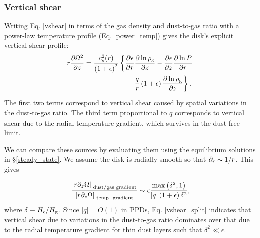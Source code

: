 \subsubsection{Vertical shear}\label{vertshear}
Writing Eq. \ref{vshear} in terms of the gas density and dust-to-gas
ratio with a power-law temperature profile (Eq. \ref{power_temp})
gives the disk's explicit vertical shear profile:
\begin{align}\label{vshear2}
  &r\frac{\p \Omega^2}{\p z}  =
  \frac{c_s^2(r)}{\left(1+\epsilon\right)^2}\left\{
  \frac{\p\epsilon}{\p r}\frac{\p\ln{\rhog}}{\p z}
 -\frac{\p\epsilon}{\p z}\frac{\p\ln{P}}{\p r}\right.\notag\\
  &\phantom{ r\frac{\p \Omega^2}{\p z}  =
    \frac{c_s^2(r)}{\left(1+\epsilon\right)^2}\left\{\right\} }
  \left. -\frac{q}{r} \left(1+\epsilon\right)\frac{\p\ln{\rhog}}{\p z}
  \right\}. 
\end{align}
The first two terms correspond to vertical shear caused by spatial
variations in the dust-to-gas ratio. The third term
proportional to $q$ corresponds to vertical shear due to the 
radial temperature gradient, which survives in the dust-free limit. 

We can compare these sources by 
evaluating them using the equilibrium
solutions in \S\ref{steady_state}. We assume the disk is radially
smooth so that $\partial_r\sim 1/r$. %
This gives 

\begin{align}\label{vshear_split}
  \frac{\left|r\partial_z\Omega\right|_{\text{
        dust/gas gradient}}}{\left|r\partial_z\Omega\right|_{\text{
        temp. gradient}}} \sim
 \epsilon \frac{\mathrm{max}\left(\delta^2,
    1\right)}{\left|q\right|\left(1+\epsilon\right)\delta^2},
\end{align}
where $\delta\equiv H_\epsilon/H_\mathrm{g}$. 
Since $|q|=O(1)$ in PPDs, Eq. \ref{vshear_split} indicates that
vertical shear due to variations in the dust-to-gas ratio dominates 
over that due to the radial temperature gradient for thin dust layers
such that $\delta^2\ll \epsilon$. %






